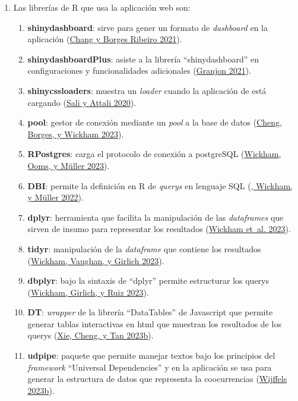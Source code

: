 \documentclass[
  12pt,
  openany]{book}
\begin{document}
\begin{enumerate}
\def\labelenumi{\arabic{enumi}.}
\item
  Las librerías de R que usa la aplicación web son:

  \begin{enumerate}
  \def\labelenumii{\arabic{enumii}.}
  \item
    \textbf{shinydashboard}: sirve para gener un formato de \emph{dashboard} en la aplicación (\protect\hyperlink{ref-shinydashboard}{Chang y Borges Ribeiro 2021}).
  \item
    \textbf{shinydashboardPlus}: asiste a la librería ``shinydashboard'' en configuraciones y funcionalidades adicionales (\protect\hyperlink{ref-shinydashboardPlus}{Granjon 2021}).
  \item
    \textbf{shinycssloaders}: muestra un \emph{loader} cuando la aplicación de está cargando (\protect\hyperlink{ref-shinycssloaders}{Sali y Attali 2020}).
  \item
    \textbf{pool}: gestor de conexión mediante un \emph{pool} a la base de datos (\protect\hyperlink{ref-pool}{Cheng, Borges, y Wickham 2023}).
  \item
    \textbf{RPostgres}: carga el protocolo de conexión a postgreSQL (\protect\hyperlink{ref-RPostgres}{Wickham, Ooms, y Müller 2023}).
  \item
    \textbf{DBI}: permite la definición en R de \emph{querys} en lenguaje SQL (\protect\hyperlink{ref-DBI}{, Wickham, y Müller 2022}).
  \item
    \textbf{dplyr}: herramienta que facilita la manipulación de las \emph{dataframes} que sirven de insumo para representar los resultados (\protect\hyperlink{ref-dplyr}{Wickham et~al. 2023}).
  \item
    \textbf{tidyr}: manipulación de la \emph{dataframe} que contiene los resultados (\protect\hyperlink{ref-tidyr}{Wickham, Vaughan, y Girlich 2023}).
  \item
    \textbf{dbplyr}: bajo la sintaxis de ``dplyr'' permite estructurar los querys (\protect\hyperlink{ref-dbplyr}{Wickham, Girlich, y Ruiz 2023}).
  \item
    \textbf{DT}: \emph{wrapper} de la librería ``DataTables'' de Javascript que permite generar tablas interactivas en html que muestran los resultados de los querys (\protect\hyperlink{ref-DT-2}{Xie, Cheng, y Tan 2023b}).
  \item
    \textbf{udpipe}: paquete que permite manejar textos bajo los principios del \emph{framework} ``Universal Dependencies'' y en la aplicación se usa para generar la estructura de datos que representa la coocurrencias (\protect\hyperlink{ref-udpipe-3}{Wijffels 2023b}).

\end{enumerate}
\end{enumerate}
\end{document}

